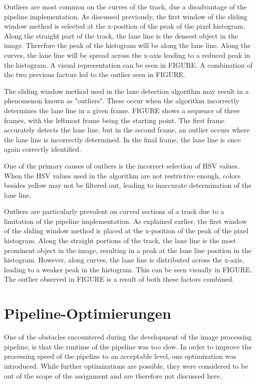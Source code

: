 \documentclass[arbeit=studie,oneside,BCOR=12mm]{ArbeitRST}
\begin{document}
Outliers are most common on the curves of the track, due a disadvantage of the
pipeline implementation. As discussed previously, the first window of the
sliding window method is selected at the x-position of the peak of the pixel
histogram. Along the straight part of the track, the lane line is the densest
object in the image. Therefore the peak of the histogram will be along the lane
line. Along the curves, the lane line will be spread across the x-axis leading
to a reduced peak in the histogram. A visual representation can be seen in
FIGURE. A combination of the two previous factors led to the outlier seen in
FIGURE.

\fi

The sliding window method used in the lane detection algorithm may result in a
phenomenon known as "outliers". These occur when the algorithm incorrectly
determines the lane line in a given frame. FIGURE shows a sequence of three
frames, with the leftmost frame being the starting point. The first frame
accurately detects the lane line, but in the second frame, an outlier occurs
where the lane line is incorrectly determined. In the final frame, the lane
line is once again correctly identified.

One of the primary causes of outliers is the incorrect selection of HSV values.
When the HSV values used in the algorithm are not restrictive enough, colors
besides yellow may not be filtered out, leading to inaccurate determination of
the lane line.

Outliers are particularly prevalent on curved sections of a track due to a
limitation of the pipeline implementation. As explained earlier, the first
window of the sliding window method is placed at the x-position of the peak of
the pixel histogram. Along the straight portions of the track, the lane line is
the most prominent object in the image, resulting in a peak at the lane line
position in the histogram. However, along curves, the lane line is distributed
across the x-axis, leading to a weaker peak in the histogram. This can be seen
visually in FIGURE. The outlier observed in FIGURE is a result of both these
factors combined.

\section{Pipeline-Optimierungen}

One of the obstacles encountered during the development of the image processing
pipeline, is that the runtime of the pipeline was too slow. In order to improve
the processing speed of the pipeline to an acceptable level, one optimization
was introduced. While further optimizations are possible, they were considered
to be out of the scope of the assignment and are therefore not discussed here.
\end{document}
